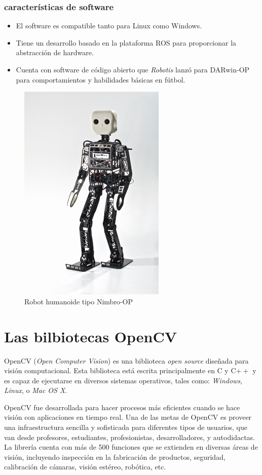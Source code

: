 	\subsubsection*{características de software}
	\begin{itemize}
	\item El software es compatible tanto para Linux como Windows.
	\item Tiene un desarrollo basado en la plataforma ROS para proporcionar la abstracción de hardware.
	\item Cuenta con software de código abierto que \textit{Robotis} lanzó para DARwin-OP para comportamientos y habilidades básicas en fútbol.
	\end{itemize}
	
\begin{figure}
\centering
\includegraphics[scale=2.0]{images/Nimbro-OP.jpg}
\caption{Robot humanoide tipo Nimbro-OP}
\label{fig:Nimbro-OP}
\end{figure} 
	
	\section{Las bilbiotecas OpenCV}
OpenCV (\textit{Open Computer Vision}) es una biblioteca \textit{open source} diseñada para visión computacional. Esta biblioteca está escrita principalmente en C y C$++$ y es capaz de ejecutarse en diversos sistemas operativos, tales como: \textit{Windows}, \textit{Linux}, o \textit{Mac OS X}.

OpenCV fue desarrollada para hacer procesos más eficientes cuando se hace visión con aplicaciones en tiempo real. Una de las metas de OpenCV es proveer una infraestructura sencilla y sofisticada para  diferentes tipos de usuarios, que van desde profesores, estudiantes, profesionistas, desarrolladores, y autodidactas. La librería cuenta con más de 500 funciones que se extienden en diversas áreas de visión, incluyendo inspección en la fabricación de productos, seguridad, calibración de cámaras, visión estéreo, robótica, etc.

